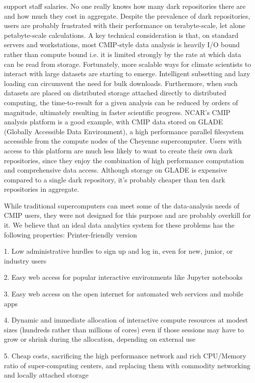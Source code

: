 \documentclass[gmd,manuscript]{copernicus}
\begin{document}
support staff salaries. No one really knows how many dark repositories
there are and how much they cost in aggregate. Despite the prevalence
of dark repositories, users are probably frustrated with their
performance on terabyte-scale, let alone petabyte-scale calculations.
A key technical consideration is that, on standard servers and
workstations, most CMIP-style data analysis is heavily I/O bound
rather than compute bound i.e. it is limited strongly by the rate at
which data can be read from storage. Fortunately, more scalable ways
for climate scientists to interact with large datasets are starting to
emerge. Intelligent subsetting and lazy loading can circumvent the
need for bulk downloads. Furthermore, when such datasets are placed on
distributed storage attached directly to distributed computing, the
time-to-result for a given analysis can be reduced by orders of
magnitude, ultimately resulting in faster scientific progress. NCAR’s
CMIP analysis platform is a good example, with CMIP data stored on
GLADE (Globally Accessible Data Environment), a high performance
parallel filesystem accessible from the compute nodes of the Cheyenne
supercomputer. Users with access to this platform are much less likely
to want to create their own dark repositories, since they enjoy the
combination of high performance computation and comprehensive data
access. Although storage on GLADE is expensive compared to a single
dark repository, it’s probably cheaper than ten dark repositories in
aggregate.

While traditional supercomputers can meet some of the data-analysis
needs of CMIP users, they were not designed for this purpose and are
probably overkill for it. We believe that an ideal data analytics
system for these problems has the following properties:
Printer-friendly version

1. Low administrative hurdles to sign up and log in, even for new,
junior, or industry users

2. Easy web access for popular interactive environments like Jupyter
notebooks

3. Easy web access on the open internet for automated web services and mobile
apps


4. Dynamic and immediate allocation of interactive compute resources
at modest sizes (hundreds rather than millions of cores) even if those
sessions may have to grow or shrink during the allocation, depending
on external use

5. Cheap costs, sacrificing the high performance network and rich
CPU/Memory ratio of super-computing centers, and replacing them with
commodity networking and locally attached storage
\end{document}
